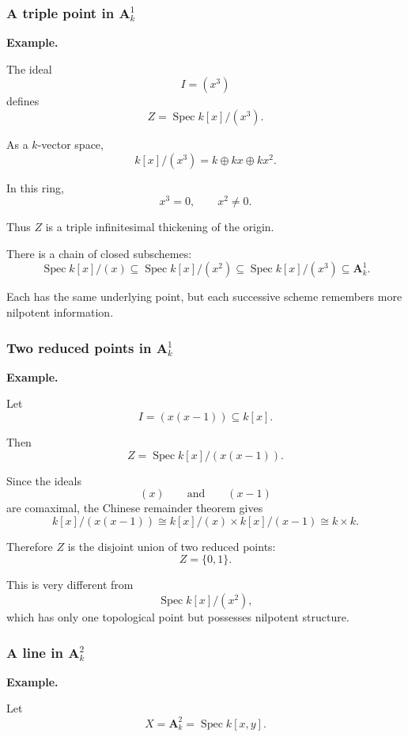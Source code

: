 \subsubsection{A triple point in \(\mathbf A^1_k\)}

\textbf{Example.}

The ideal
\[
I=(x^3)
\]
defines
\[
Z=\operatorname{Spec}k[x]/(x^3).
\]

As a \(k\)-vector space,
\[
k[x]/(x^3)
=
k\oplus kx\oplus kx^2.
\]

In this ring,
\[
x^3=0,
\qquad
x^2\neq0.
\]

Thus \(Z\) is a triple infinitesimal thickening of the origin.

There is a chain of closed subschemes:
\[
\operatorname{Spec}k[x]/(x)
\subseteq
\operatorname{Spec}k[x]/(x^2)
\subseteq
\operatorname{Spec}k[x]/(x^3)
\subseteq
\mathbf A^1_k.
\]

Each has the same underlying point, but each successive scheme remembers more nilpotent information.

\subsubsection{Two reduced points in \(\mathbf A^1_k\)}

\textbf{Example.}

Let
\[
I=(x(x-1))\subseteq k[x].
\]

Then
\[
Z=\operatorname{Spec}k[x]/(x(x-1)).
\]

Since the ideals
\[
(x)
\qquad\text{and}\qquad
(x-1)
\]
are comaximal, the Chinese remainder theorem gives
\[
k[x]/(x(x-1))
\cong
k[x]/(x)\times k[x]/(x-1)
\cong
k\times k.
\]

Therefore \(Z\) is the disjoint union of two reduced points:
\[
Z=\{0,1\}.
\]

This is very different from
\[
\operatorname{Spec}k[x]/(x^2),
\]
which has only one topological point but possesses nilpotent structure.

\subsubsection{A line in \(\mathbf A^2_k\)}

\textbf{Example.}

Let
\[
X=\mathbf A^2_k=\operatorname{Spec}k[x,y].
\]

